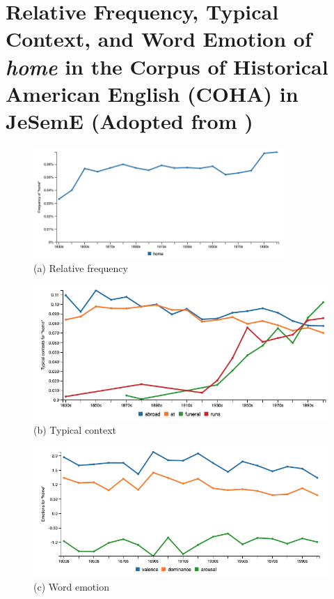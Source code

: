 \section{Relative Frequency, Typical Context, and Word Emotion of \textit{home} in the Corpus of Historical American English (COHA) in JeSemE (Adopted from \textcite{hellrich2017exploring})}

\begin{figure}[H]
    \centering
    \includegraphics[width=0.85\textwidth]{figures_ref/jeseme_relative_frequency}
    \caption*{(a) Relative frequency}
\end{figure}

\begin{figure}[H]
    \centering
    \includegraphics[width=\textwidth]{figures_ref/jeseme_typical_context}
    \caption*{(b) Typical context}
\end{figure}

\begin{figure}[H]
    \centering
    \includegraphics[width=\textwidth]{figures_ref/jeseme_word_emotion}
    \caption*{(c) Word emotion}
\end{figure}